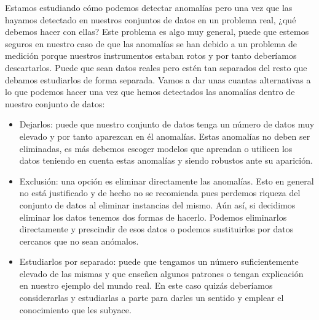 Estamos estudiando cómo podemos detectar anomalías pero una vez que las hayamos detectado en nuestros conjuntos de datos en un problema real, ¿qué debemos hacer con ellas? Este problema es algo muy general, puede que estemos seguros en nuestro caso de que las anomalías se han debido a un problema de medición porque nuestros instrumentos estaban rotos y por tanto deberíamos descartarlos. Puede que sean datos reales pero estén tan separados del resto que debamos estudiarlos de forma separada. Vamos a dar unas cuantas alternativas a lo que podemos hacer una vez que hemos detectados las anomalías dentro de nuestro conjunto de datos:

\begin{itemize}
	\item Dejarlos: puede que nuestro conjunto de datos tenga un número de datos muy elevado y por tanto aparezcan en él anomalías. Estas anomalías no deben ser eliminadas, es más debemos escoger modelos que aprendan o utilicen los datos teniendo en cuenta estas anomalías y siendo robustos ante su aparición.
	\item Exclusión: una opción es eliminar directamente las anomalías. Esto en general no está justificado y de hecho no se recomienda pues perdemos riqueza del conjunto de datos al eliminar instancias del mismo. Aún así, si decidimos eliminar los datos tenemos dos formas de hacerlo. Podemos eliminarlos directamente y prescindir de esos datos o podemos sustituirlos por datos cercanos que no sean anómalos.
	\item Estudiarlos por separado: puede que tengamos un número suficientemente elevado de las mismas y que enseñen algunos patrones o tengan explicación en nuestro ejemplo del mundo real. En este caso quizás deberíamos considerarlas y estudiarlas a parte para darles un sentido y emplear el conocimiento que les subyace.
\end{itemize}